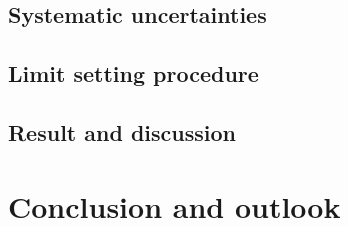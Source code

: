\section{Systematic uncertainties}

\section{Limit setting procedure}
\section{Result and discussion}
\chapter{Conclusion and outlook}
\label{s:showcase}
%



\backmatter

\hypersetup{urlcolor=darkgreen}
\printbibliography  %
\hypersetup{urlcolor=darkblue}


